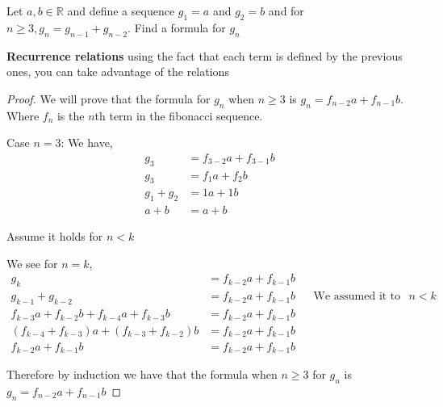 \documentclass[11pt]{article}
\newenvironment{problem}[2][Problem\!]{\begin{trivlist}
\item[\hskip \labelsep {\bfseries #1}\hskip \labelsep {\bfseries #2}]}{\end{trivlist}}
\newcommand{\rr}{\mathbb R}   %
\renewcommand{\geq}{\geqslant}
\begin{document}
\begin{tcolorbox}
    \begin{problem}{IC | 10/1 |19.} Let $a,b \in \rr$ and define a sequence $g_1 = a$ and $g_2 = b$ and for $n \geq 3, g_n = g_{n-1} + g_{n-2}$. Find a formula for $g_n$ 
    \end{problem}
    \textbf{Recurrence relations} using the fact that each term is defined by the previous ones, you can take advantage of the relations
\end{tcolorbox}
\begin{proof}
    We will prove that the formula for $g_n$ when $n \geq 3$ is $g_{n} = f_{n-2}a + f_{n-1}b$. Where $f_n$ is the $n$th term in the fibonacci sequence.

    Case $n=3$: We have,
    \begin{align*}
         g_{3} &= f_{3-2}a + f_{3-1}b\\
         g_3 &= f_1a + f_2b \\
         g_1 + g_2 &=  1a + 1b \\
        a + b &= a + b
    \end{align*}
    
    Assume it holds for $n < k$

    We see for $n = k$,
    \begin{align*}
        g_k &= f_{k -2}a + f_{k -1}b \\
        g_{k-1} + g_{k-2} &= f_{k-2}a + f_{k-1}b  && \text{We assumed it to hold for $n < k$} \\
        f_{k -3}a + f_{k -2}b + f_{k-4}a + f_{k-3}b &= f_{k-2}a + f_{k-1}b \\
        (f_{k-4} + f_{k-3})a + (f_{k-3}+f_{k-2})b&=f_{k-2}a + f_{k-1}b \\
        f_{k-2}a + f_{k-1}b &= f_{k-2}a + f_{k-1}b
    \end{align*}

    Therefore by induction we have that the formula when $n\geq 3$ for $g_n$ is $g_n = f_{n-2}a + f_{n-1}b$
    
\end{proof}
\end{document}
